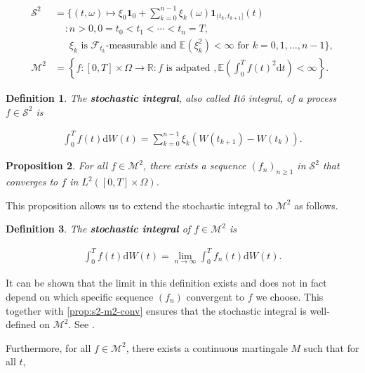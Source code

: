 \documentclass[a4paper]{article}
\newtheorem{definition}{Definition}[section]
\newtheorem{proposition}[definition]{Proposition}
\begin{document}
\begin{align*}
  \mathcal{S}^2 &= \{ (t,\omega) \mapsto \xi_0 \mathbf{1}_0 + \sum_{k=0}^{n-1} \xi_k(\omega) \mathbf{1}_{(t_k,t_{k+1}]}(t)\\
    &\ \ \ \ \ : n > 0, 0 = t_0 < t_1 < \cdots < t_n = T,\\
    &\ \ \ \ \ \ \ \xi_k \text{ is } \mathcal{F}_{t_k}\text{-measurable and } \mathbb{E}(\xi_k^2) < \infty \text{ for } k = 0,1,\ldots,n-1 \},\\
  \mathcal{M}^2 &= \left\{ f : [0,T] \times \Omega \to \mathbb{R} : f \text{ is adpated }, \mathbb{E}\left(\int_0^T f(t)^2 \mathrm{d}t \right) < \infty \right\}.
\end{align*}

\begin{definition}
  The \textbf{stochastic integral}, also called It\^o integral, of a process $f \in \mathcal{S}^2$ is

  \begin{align*}
    \int_0^T f(t) \mathrm{d}W(t) = \sum_{k=0}^{n-1} \xi_k (W(t_{k+1}) - W(t_k)).
  \end{align*}
\end{definition}

\begin{proposition}\label{prop:s2-m2-conv}
  For all $f \in \mathcal{M}^2$, there exists a sequence $(f_n)_{n \ge 1}$ in $\mathcal{S}^2$ that converges to $f$ in $L^2([0,T] \times \Omega)$.
\end{proposition}

This proposition allows us to extend the stochastic integral to $\mathcal{M}^2$ as follows.

\begin{definition}
  The \textbf{stochastic integral} of $f \in \mathcal{M}^2$ is

  \begin{align*}
    \int_0^T f(t) \mathrm{d}W(t) = \lim_{n \to \infty} \int_0^T f_n(t) \mathrm{d}W(t).
  \end{align*}
\end{definition}

It can be shown that the limit in this definition exists and does not in fact depend on which specific sequence $(f_n)$ convergent to $f$ we choose. This together with \eqref{prop:s2-m2-conv} ensures that the stochastic integral is well-defined on $\mathcal{M}^2$. See \textcite{capinski_stochastic_2012}.

Furthermore, for all $f \in \mathcal{M}^2$, there exists a continuous martingale $M$ such that for all $t$,
\end{document}
